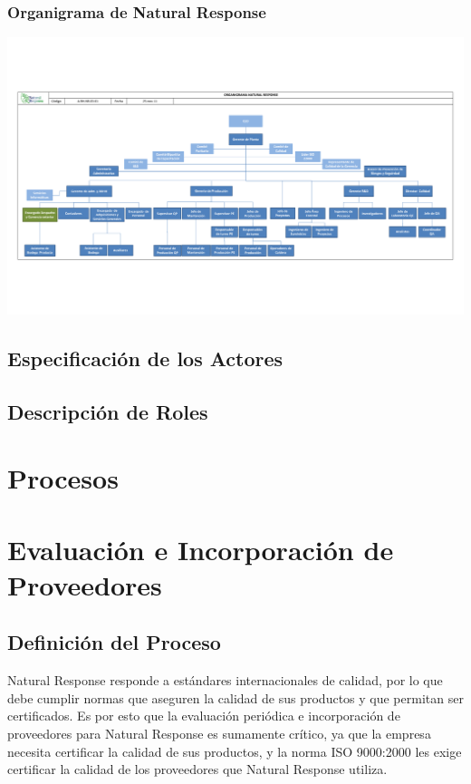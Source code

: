 \documentclass[12pt,letterpaper]{article}
\begin{document}
\subsubsection{Organigrama de Natural Response}
\includegraphics[angle=90,page=1,height=\textheight - 40px]{organigrama_nr.pdf}

\subsection{Especificación de los Actores}

\subsection{Descripción de Roles}

\section{Procesos}

\section{Evaluación e Incorporación de Proveedores}

\subsection{Definición del Proceso}
Natural Response responde a estándares internacionales de calidad, por lo que debe cumplir normas que aseguren la calidad de sus productos y que permitan ser certificados. Es por esto que la evaluación periódica e incorporación de proveedores para Natural Response es sumamente crítico, ya que la empresa necesita certificar la calidad de sus productos, y la norma ISO 9000:2000 les exige certificar la calidad de los proveedores que Natural Response utiliza.\\
\end{document}
